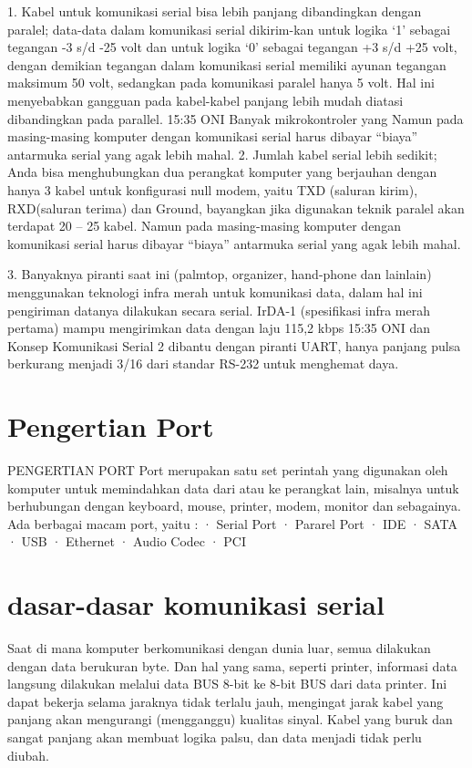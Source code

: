 {{1. Kabel untuk komunikasi serial bisa lebih panjang dibandingkan dengan paralel; data-data dalam komunikasi serial dikirim-kan untuk logika ‘1’ sebagai tegangan -3 s/d -25 volt dan untuk logika ‘0’ sebagai tegangan +3 s/d +25 volt, dengan demikian tegangan dalam komunikasi serial memiliki ayunan tegangan maksimum 50 volt, sedangkan pada komunikasi paralel hanya 5 volt. Hal ini menyebabkan gangguan pada kabel-kabel panjang lebih mudah diatasi dibandingkan pada parallel.
15:35 ONI Banyak mikrokontroler yang Namun pada masing-masing komputer dengan komunikasi serial harus dibayar “biaya” antarmuka serial yang agak lebih mahal.
2. Jumlah kabel serial lebih sedikit; Anda bisa menghubungkan dua perangkat komputer yang berjauhan dengan hanya 3 kabel untuk konfigurasi null modem, yaitu TXD (saluran kirim), RXD(saluran terima) dan Ground, bayangkan jika digunakan teknik paralel akan terdapat 20 – 25 kabel. Namun pada masing-masing komputer dengan komunikasi serial harus dibayar “biaya” antarmuka serial yang agak lebih mahal.

3. Banyaknya piranti saat ini (palmtop, organizer, hand-phone dan lainlain) menggunakan teknologi infra merah untuk komunikasi data, dalam hal ini pengiriman datanya dilakukan secara serial. IrDA-1 (spesifikasi infra merah pertama) mampu mengirimkan data dengan laju 115,2 kbps
15:35 ONI dan Konsep Komunikasi Serial 2 dibantu dengan piranti UART, hanya panjang pulsa berkurang menjadi 3/16 dari standar RS-232 untuk menghemat daya.









\section {Pengertian Port}
PENGERTIAN  PORT
Port merupakan satu set perintah yang digunakan oleh komputer untuk memindahkan data dari atau ke perangkat lain, misalnya untuk berhubungan dengan keyboard, mouse, printer, modem, monitor dan sebagainya. Ada berbagai macam port, yaitu :
·         Serial Port
·         Pararel Port
·         IDE
·         SATA
·         USB
·         Ethernet
·         Audio Codec
·         PCI


\section {dasar-dasar komunikasi serial}
Saat di mana komputer berkomunikasi dengan dunia luar, semua dilakukan dengan data berukuran byte. Dan hal yang sama, seperti printer, informasi data langsung dilakukan melalui data BUS 8-bit ke 8-bit BUS dari data printer. Ini dapat bekerja selama jaraknya tidak terlalu jauh, mengingat jarak kabel yang panjang akan mengurangi (mengganggu) kualitas sinyal. Kabel yang buruk dan sangat panjang akan membuat logika palsu, dan data menjadi tidak perlu diubah.
}}
